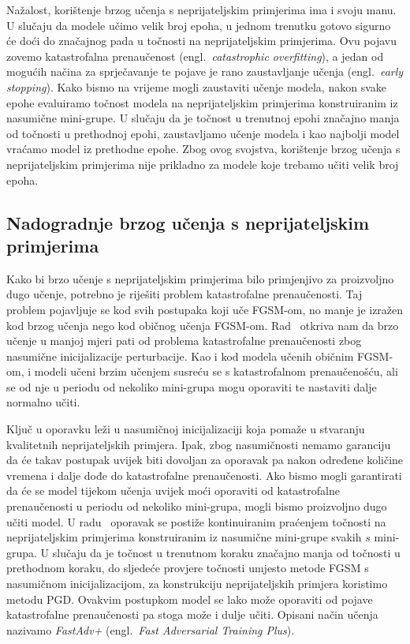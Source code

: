 \documentclass[times, utf8, zavrsni, numeric]{fer}
\begin{document}
Nažalost, korištenje brzog učenja s neprijateljskim primjerima ima i svoju manu. U slučaju da modele učimo velik broj epoha,
u jednom trenutku gotovo sigurno će doći do značajnog pada u točnosti na neprijateljskim primjerima. Ovu pojavu zovemo katastrofalna prenaučenost (engl.\ \textit{catastrophic overfitting}),
a jedan od mogućih načina za sprječavanje te pojave je rano zaustavljanje učenja (engl.\ \textit{early stopping}). 
Kako bismo na vrijeme mogli zaustaviti učenje modela, nakon svake epohe evaluiramo točnost modela na neprijateljskim primjerima konstruiranim iz nasumične mini-grupe.
U slučaju da je točnost u trenutnoj epohi značajno manja od točnosti u prethodnoj epohi, zaustavljamo učenje modela i kao najbolji model vraćamo model iz prethodne epohe.
Zbog ovog svojstva, korištenje brzog učenja s neprijateljskim primjerima nije prikladno za modele koje trebamo učiti velik broj epoha.

\subsection{Nadogradnje brzog učenja s neprijateljskim primjerima}

Kako bi brzo učenje s neprijateljskim primjerima bilo primjenjivo za proizvoljno dugo učenje, potrebno je riješiti problem katastrofalne prenaučenosti.
Taj problem pojavljuje se kod svih postupaka koji uče FGSM-om, no manje je izražen kod brzog učenja nego kod običnog učenja FGSM-om.
Rad~\cite{li2020towards} otkriva nam da brzo učenje u manjoj mjeri pati od problema katastrofalne prenaučenosti zbog nasumične inicijalizacije perturbacije.
Kao i kod modela učenih običnim FGSM-om, i modeli učeni brzim učenjem susreću se s katastrofalnom prenaučenošću, ali se od nje u periodu od nekoliko mini-grupa mogu oporaviti te nastaviti dalje normalno učiti.

Ključ u oporavku leži u nasumičnoj inicijalizaciji koja pomaže u stvaranju kvalitetnih neprijateljskih primjera. 
Ipak, zbog nasumičnosti nemamo garanciju da će takav postupak uvijek biti dovoljan za oporavak pa nakon određene količine vremena i dalje dođe do katastrofalne prenaučenosti.
Ako bismo mogli garantirati da će se model tijekom učenja uvijek moći oporaviti od katastrofalne prenaučenosti u periodu od nekoliko mini-grupa, mogli bismo proizvoljno dugo učiti model.
U radu~\cite{li2020towards} oporavak se postiže kontinuiranim praćenjem točnosti na neprijateljskim primjerima konstruiranim iz nasumične mini-grupe svakih $s$ mini-grupa. 
U slučaju da je točnost u trenutnom koraku značajno manja od točnosti u prethodnom koraku, do sljedeće provjere točnosti umjesto metode FGSM s nasumičnom inicijalizacijom, za konstrukciju neprijateljskih primjera koristimo metodu PGD.
Ovakvim postupkom model se lako može oporaviti od pojave katastrofalne prenaučenosti pa stoga može i dulje učiti.
Opisani način učenja nazivamo \textit{FastAdv+} (engl.\ \textit{Fast Adversarial Training Plus}).
\end{document}
